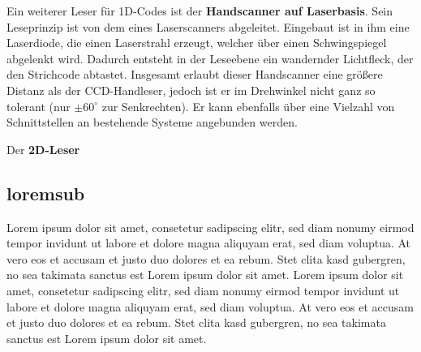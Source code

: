 Ein weiterer Leser für 1D-Codes ist der \textbf{Handscanner auf Laserbasis}. Sein Leseprinzip ist von dem eines Laserscanners abgeleitet. Eingebaut ist in ihm eine Laserdiode, die einen Laserstrahl erzeugt, welcher über einen Schwingspiegel abgelenkt wird. Dadurch entsteht in der Leseebene ein wandernder Lichtfleck, der den Strichcode abtastet. Insgesamt erlaubt dieser Handscanner eine größere Distanz als der CCD-Handleser, jedoch ist er im Drehwinkel nicht ganz so tolerant (nur $\pm60^\circ$ zur Senkrechten). Er kann ebenfalls über eine Vielzahl von Schnittstellen an bestehende Systeme angebunden werden.

Der \textbf{2D-Leser}

\subsection{loremsub}
Lorem ipsum dolor sit amet, consetetur sadipscing elitr, sed diam nonumy eirmod tempor invidunt ut labore et dolore magna aliquyam erat, sed diam voluptua. At vero eos et accusam et justo duo dolores et ea rebum. Stet clita kasd gubergren, no sea takimata sanctus est Lorem ipsum dolor sit amet. Lorem ipsum dolor sit amet, consetetur sadipscing elitr, sed diam nonumy eirmod tempor invidunt ut labore et dolore magna aliquyam erat, sed diam voluptua. At vero eos et accusam et justo duo dolores et ea rebum. Stet clita kasd gubergren, no sea takimata sanctus est Lorem ipsum dolor sit amet.
\pagebreak
